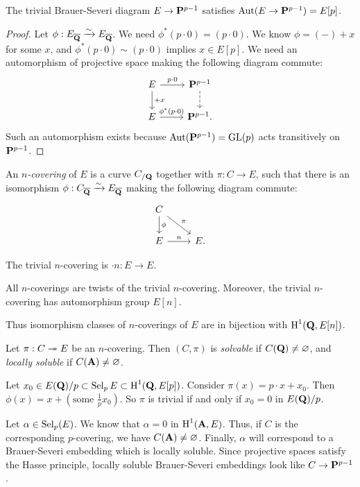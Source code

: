 \begin{lemma}
The trivial Brauer-Severi diagram $E\to \mathbf{P}^{p-1}$ satisfies 
$\operatorname{Aut}(E\to \mathbf{P}^{p-1})=E[p]$. 
\end{lemma}
\begin{proof}
Let $\phi:E_{\overline{\mathbf{Q}}}\xrightarrow\sim E_{\overline{\mathbf{Q}}}$. We need 
$\phi^\ast(p\cdot 0)=(p\cdot 0)$. We know $\phi=(-)+x$ for some $x$, and 
$\phi^\ast(p\cdot 0)\sim (p\cdot 0)$ implies $x\in E[p]$. We need an 
automorphism of projective space making the following diagram commute:
\[\begin{tikzcd}
  E \ar[r, "p\cdot 0"] \ar[d, "+x"] 
    & \dP^{p-1} \ar[d, dashrightarrow] \\
  E \ar[r, "\phi^\ast(p\cdot 0)"] 
    & \dP^{p-1} .
\end{tikzcd}\]
Such an automorphism exists because $\operatorname{Aut}(\mathbf{P}^{p-1})=\operatorname{GL}(p)$ acts 
transitively on $\mathbf{P}^{p-1}$. 
\end{proof}

\begin{definition}
An \emph{$n$-covering} of $E$ is a curve $C_{/\mathbf{Q}}$ together with 
$\pi:C\to E$, such that there is an isomorphism 
$\phi:C_{\overline{\mathbf{Q}}}\xrightarrow\sim E_{\overline{\mathbf{Q}}}$ making the following diagram 
commute: 
\[\begin{tikzcd}
  C \ar[d, "\phi"] \ar[dr, "\pi"] \\
  E \ar[r, "n"] 
    & E .
\end{tikzcd}\]
\end{definition}

The trivial $n$-covering is $\cdot n:E\to E$. 

\begin{lemma}
All $n$-coverings are twists of the trivial $n$-covering. Moreover, 
the trivial $n$-covering has automorphism group $E[n]$. 
\end{lemma}

Thus isomorphism classes of $n$-coverings of $E$ are in bijection with 
$\operatorname{H}^1(\mathbf{Q},E[n])$. 

\begin{definition}
Let $\pi:C\twoheadrightarrow E$ be an $n$-covering. Then $(C,\pi)$ is \emph{solvable} 
if $C(\mathbf{Q})\ne\varnothing$, and \emph{locally soluble} if 
$C(\mathbf{A})\ne\varnothing$. 
\end{definition}

Let $x_0\in E(\mathbf{Q})/p\subset \operatorname{Sel}_p E\subset \operatorname{H}^1(\mathbf{Q},E[p])$. Consider 
$\pi(x)=p\cdot x+x_0$. Then $\phi(x)=x+(\text{some }\frac 1 p x_0)$. So 
$\pi$ is trivial if and only if $x_0=0$ in $E(\mathbf{Q})/p$. 

Let $\alpha\in \operatorname{Sel}_p(E)$. We know that $\alpha=0$ in 
$\operatorname{H}^1(\mathbf{A},E)$. Thus, if $C$ is the corresponding $p$-covering, we have 
$C(\mathbf{A})\ne\varnothing$. Finally, $\alpha$ will correspond to a Brauer-Severi 
embedding which is locally soluble. Since projective spaces satisfy the 
Hasse principle, locally soluble Brauer-Severi embeddings look like 
$C\to \mathbf{P}^{p-1}$. 




